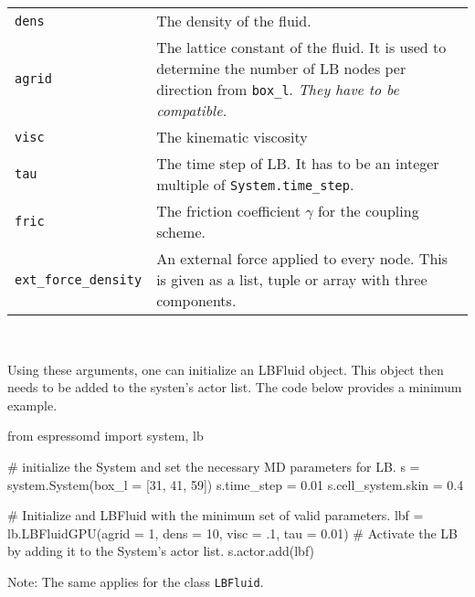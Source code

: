 \vspace{0,2cm}
\begin{tabular}{p{}p{}}
\texttt{dens} & The density of the fluid.\\
\texttt{agrid} & The lattice constant of the fluid. It is used to determine the number of LB nodes 
per direction from \texttt{box\_l}. {\em They have to be compatible.} \\
\texttt{visc} & The kinematic viscosity \\
  \texttt{tau} & The time step of LB. It has to be an integer multiple of
  \texttt{System.time\_step}. \\
\texttt{fric} & The friction coefficient $\gamma$ for the coupling scheme. \\
\texttt{ext\_force_density} & An external force applied to every node. This is given as
a list, tuple or array with three components.%
\end{tabular}\\ 
\vspace{0,2cm}

Using these arguments, one can initialize an LBFluid object. This object then
needs to be added to the systen's actor list. The code below provides a minimum
example.
\vspace{0,2cm}
\begin{pypresso}
  from espressomd import system, lb

  # initialize the System and set the necessary MD parameters for LB.
  s = system.System(box_l = [31, 41, 59])
  s.time_step = 0.01
  s.cell_system.skin = 0.4

  # Initialize and LBFluid with the minimum set of valid parameters.
  lbf = lb.LBFluidGPU(agrid = 1, dens = 10, visc = .1, tau = 0.01)
  # Activate the LB by adding it to the System's actor list.
  s.actor.add(lbf)
\end{pypresso}
\vspace{0,2cm}
Note: The same applies for the class \texttt{LBFluid}.

